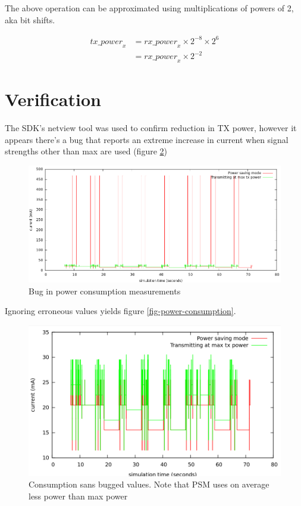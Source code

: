 \documentclass{article}
\begin{document}
The above operation can be approximated using multiplications of powers of 2, aka bit shifts.

\begin{align*}
\mathit{tx\_power}_x
&= \mathit{rx\_power}_x \times 2^{-8} \times 2^6 \\
&= \mathit{rx\_power}_x \times 2^{-2}
\end{align*}

\section{Verification}

The SDK's netview tool was used to confirm reduction in TX power, however it appears there's a bug
that reports an extreme increase in current when signal strengths other than max are used (figure \ref{fig:crazy-power})

\begin{figure}
\noindent\hspace*{-60pt}\includegraphics[scale=0.5]{power-consumption.png}
\caption{Bug in power consumption measurements}
\label{fig:crazy-power}
\end{figure}

Ignoring erroneous values yields figure \ref{fig-power-consumption}.

\begin{figure}
  \noindent\hspace*{-60pt}\includegraphics[scale=0.5]{power-consumption-saving.png}
  \caption{Consumption sans bugged values. Note that PSM uses on average less power than max power}
  \label{fig:crazy-power}
\end{figure}
\end{document}
